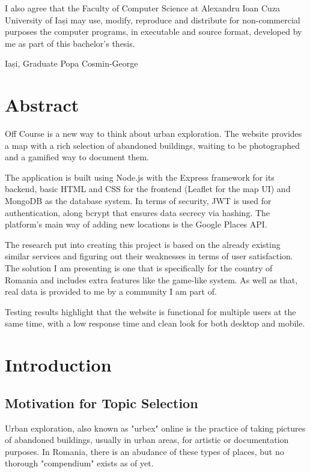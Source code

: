 \documentclass[12pt,a4paper]{report}
\begin{document}
I also agree that the Faculty of Computer Science at Alexandru Ioan Cuza University of Iași may use, modify, reproduce and distribute for non-commercial purposes the computer programs, in executable and source format, developed by me as part of this bachelor's thesis.

\vspace{2cm}
Iași, \hfill Graduate Popa Cosmin-George


\tableofcontents
\newpage

\chapter*{Abstract}

Off Course is a new way to think about urban exploration. The website provides a map with a rich selection of abandoned buildings, waiting to be photographed and a gamified way to document them.

The application is built using Node.js with the Express framework for its backend, basic HTML and CSS for the frontend (Leaflet for the map UI) and MongoDB as the database system. In terms of security, JWT is used for authentication, along bcrypt that ensures data secrecy via hashing. The platform's main way of adding new locations is the Google Places API.

The research put into creating this project is based on the already existing similar services and figuring out their weaknesses in terms of user satisfaction. The solution I am presenting is one that is specifically for the country of Romania and includes extra features like the game-like system. As well as that, real data is provided to me by a community I am part of.

Testing results highlight that the website is functional for multiple users at the same time, with a low response time and clean look for both desktop and mobile.

\newpage

\chapter*{Introduction}

\section*{Motivation for Topic Selection}

Urban exploration, also known as "urbex" online is the practice of taking pictures of abandoned buildings, usually in urban areas, for artistic or documentation purposes. In Romania, there is an abudance of these types of places, but no thorough "compendium" exists as of yet.
\end{document}
